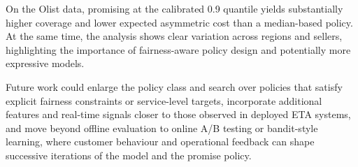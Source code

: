 \documentclass[12pt]{article}
\begin{document}
On the Olist data, promising at the calibrated 0.9 quantile yields substantially higher coverage and lower expected asymmetric cost than a median-based policy. At the same time, the analysis shows clear variation across regions and sellers, highlighting the importance of fairness-aware policy design and potentially more expressive models.

Future work could enlarge the policy class and search over policies that satisfy explicit fairness constraints or service-level targets, incorporate additional features and real-time signals closer to those observed in deployed ETA systems, and move beyond offline evaluation to online A/B testing or bandit-style learning, where customer behaviour and operational feedback can shape successive iterations of the model and the promise policy.

\newpage
\renewcommand{\refname}{References} %
\end{document}
